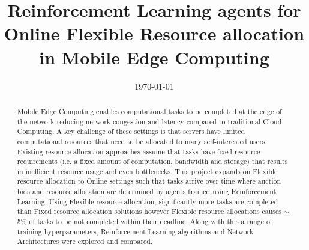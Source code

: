 \documentclass[sotoncolour]{extra/uos_project}     %
\title       {Reinforcement Learning agents for Online Flexible Resource allocation in Mobile Edge Computing}
\date       {\today}
\begin{document}
\frontmatter
\maketitle
\begin{abstract}
  Mobile Edge Computing enables computational tasks to be completed at the edge of the network reducing
  network congestion and latency compared to traditional Cloud Computing. A key challenge of these settings is that
  servers have limited computational resources that need to be allocated to many self-interested users. Existing
  resource allocation approaches assume that tasks have fixed resource requirements (i.e. a fixed amount of
  computation, bandwidth and storage) that results in inefficient resource usage and even bottlenecks.
  This project expands on Flexible resource allocation to Online settings such that tasks arrive over time where auction
  bids and resource allocation are determined by agents trained using Reinforcement Learning.
  Using Flexible resource allocation, significantly more tasks are completed than Fixed resource allocation solutions
  however Flexible resource allocations causes $\sim$5\% of tasks to be not completed within their deadline.
  Along with this a range of training hyperparameters, Reinforcement Learning algorithms and Network Architectures were
  explored and compared.
\end{abstract}

\tableofcontents
\listoffigures
\listoftables

\end{document}
